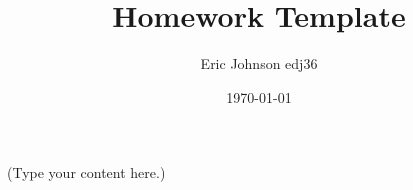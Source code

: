 \documentclass{article}
\title{Homework Template}
\author{Eric Johnson edj36}
\date{\today}
\begin{document}
\maketitle
(Type your content here.)
\end{document}
